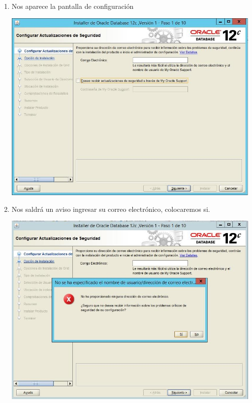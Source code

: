 \begin{enumerate}[1.]
	\item Nos aparece la pantalla de configuraci\'on \\
	\begin{center}
	\includegraphics[width=15cm]{./Imagenes/img12} 
	\end{center}

	\item Nos saldr\'a un aviso ingresar su correo electr\'onico, colocaremos si.\\
	\begin{center}
	\includegraphics[width=15cm]{./Imagenes/img13} 
	\end{center}


\end{enumerate}

